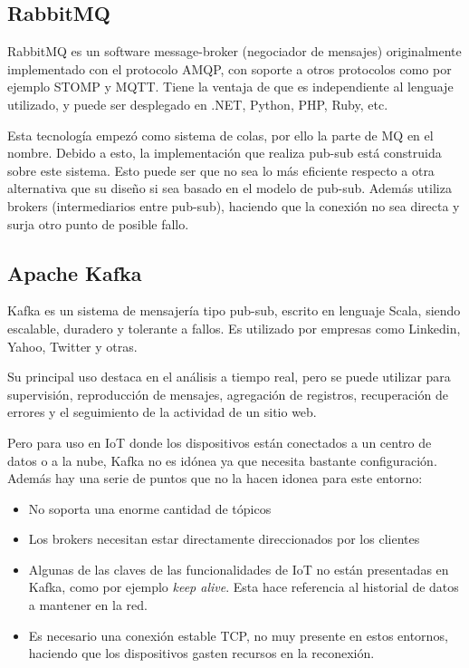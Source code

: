 \subsection{RabbitMQ}

RabbitMQ \cite{rabbitmq} es un software message-broker (negociador de mensajes) originalmente implementado con el protocolo \ac{AMQP}, con soporte a otros protocolos como por ejemplo \ac{STOMP} y \ac{MQTT}. Tiene la ventaja de que es independiente al lenguaje utilizado, y puede ser desplegado en .NET, Python, PHP, Ruby, etc.

Esta tecnología empezó como sistema de colas, por ello la parte de MQ en el nombre. Debido a esto, la implementación que realiza pub-sub está construida sobre este sistema. Esto puede ser que no sea lo más eficiente respecto a otra alternativa que su diseño si sea basado en el modelo de pub-sub. Además utiliza brokers (intermediarios entre pub-sub), haciendo que la conexión no sea directa y surja otro punto de posible fallo.

\subsection{Apache Kafka}

Kafka \cite{kafka} es un sistema de mensajería tipo pub-sub, escrito en lenguaje Scala, siendo escalable, duradero y tolerante a fallos. Es utilizado por empresas como Linkedin, Yahoo, Twitter y otras.

Su principal uso destaca en el análisis a tiempo real, pero se puede utilizar para supervisión, reproducción de mensajes, agregación de registros, recuperación de errores y el seguimiento de la actividad de un sitio web.

Pero para uso en IoT donde los dispositivos están conectados a un centro de datos o a la nube, Kafka no es idónea ya que necesita bastante configuración. Además hay una serie de puntos que no la hacen idonea para este entorno:
\begin{itemize}
    \item No soporta una enorme cantidad de tópicos
    \item Los brokers necesitan estar directamente direccionados por los clientes
    \item Algunas de las claves de las funcionalidades de IoT no están presentadas en Kafka, como por ejemplo \textit{keep alive}. Esta hace referencia al historial de datos a mantener en la red.
    \item Es necesario una conexión estable TCP, no muy presente en estos entornos, haciendo que los dispositivos gasten recursos en la reconexión.
\end{itemize}

